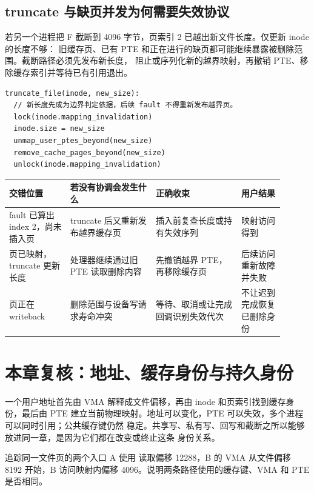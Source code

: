 \subsection{truncate 与缺页并发为何需要失效协议}

若另一个进程把 F 截断到 4096 字节，页索引 2 已越出新文件长度。仅更新 inode 的长度不够：
旧缓存页、已有 PTE 和正在进行的缺页都可能继续暴露被删除范围。截断路径必须先发布新长度，
阻止或序列化新的越界映射，再撤销 PTE、移除缓存索引并等待已有引用退出。

\begin{lstlisting}
truncate_file(inode, new_size):
  // 新长度先成为边界判定依据，后续 fault 不得重新发布越界页。
  lock(inode.mapping_invalidation)
  inode.size = new_size
  unmap_user_ptes_beyond(new_size)
  remove_cache_pages_beyond(new_size)
  unlock(inode.mapping_invalidation)
\end{lstlisting}

\begin{longtable}{|L{0.20\linewidth}|L{0.28\linewidth}|L{0.28\linewidth}|L{0.14\linewidth}|}
\hline
交错位置 & 若没有协调会发生什么 & 正确收束 & 用户结果 \\ \hline
fault 已算出 index 2，尚未插入页 & truncate 后又重新发布越界缓存页 &
插入前复查长度或持有失效序列 & 映射访问得到  \\\tablerowrule
页已映射，truncate 更新长度 & 处理器继续通过旧 PTE 读取删除内容 &
先撤销越界 PTE，再移除缓存页 & 后续访问重新故障并失败 \\\tablerowrule
页正在 writeback & 删除范围与设备写请求寿命冲突 &
等待、取消或让完成回调识别失效代次 & 不让迟到完成恢复已删除身份 \\ \hline
\end{longtable}

\section{本章复核：地址、缓存身份与持久身份}

一个用户地址首先由 VMA 解释成文件偏移，再由 inode 和页索引找到缓存身份，最后由 PTE
建立当前物理映射。地址可以变化，PTE 可以失效，多个进程可以同时引用；公共缓存键仍然
稳定。共享写、私有写、回写和截断之所以能够放进同一章，是因为它们都在改变或终止这条
身份关系。

\begin{chapterexercise}{追踪同一文件页的两个入口}
A 使用  读取偏移 12288，B 的 VMA 从文件偏移 8192 开始，B 访问映射内偏移
4096。说明两条路径使用的缓存键、VMA 和 PTE 是否相同。
\end{chapterexercise}

